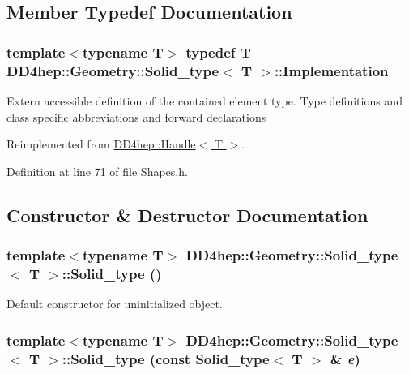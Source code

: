 \subsection{Member Typedef Documentation}
\hypertarget{class_d_d4hep_1_1_geometry_1_1_solid__type_a660e91d2703f947ad759fe0cbef3bbc6}{
\subsubsection[{Implementation}]{\setlength{\rightskip}{0pt plus 5cm}template$<$typename T$>$ typedef {\bf T} {\bf DD4hep::Geometry::Solid\_\-type}$<$ {\bf T} $>$::{\bf Implementation}}}
\label{class_d_d4hep_1_1_geometry_1_1_solid__type_a660e91d2703f947ad759fe0cbef3bbc6}


Extern accessible definition of the contained element type. Type definitions and class specific abbreviations and forward declarations 

Reimplemented from \hyperlink{class_d_d4hep_1_1_handle_ad7ff728a25806079516b8965b9113f1a}{DD4hep::Handle$<$ T $>$}.

Definition at line 71 of file Shapes.h.

\subsection{Constructor \& Destructor Documentation}
\hypertarget{class_d_d4hep_1_1_geometry_1_1_solid__type_a0a2d2c18f2e6934bbd93f26a13704020}{
\subsubsection[{Solid\_\-type}]{\setlength{\rightskip}{0pt plus 5cm}template$<$typename T$>$ {\bf DD4hep::Geometry::Solid\_\-type}$<$ {\bf T} $>$::{\bf Solid\_\-type} ()}}
\label{class_d_d4hep_1_1_geometry_1_1_solid__type_a0a2d2c18f2e6934bbd93f26a13704020}


Default constructor for uninitialized object. \hypertarget{class_d_d4hep_1_1_geometry_1_1_solid__type_ac4062fddd8f1fb9971577c600e9f7995}{
\subsubsection[{Solid\_\-type}]{\setlength{\rightskip}{0pt plus 5cm}template$<$typename T$>$ {\bf DD4hep::Geometry::Solid\_\-type}$<$ {\bf T} $>$::{\bf Solid\_\-type} (const {\bf Solid\_\-type}$<$ {\bf T} $>$ \& {\em e})}}
\label{class_d_d4hep_1_1_geometry_1_1_solid__type_ac4062fddd8f1fb9971577c600e9f7995}


